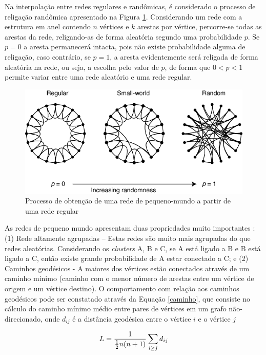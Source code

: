Na interpolação entre redes regulares e randômicas, é considerado o processo de religação randômica apresentado na Figura \ref{graph_world}. Considerando um rede com a estrutura em anel contendo $n$ vértices e $k$ arestas por vértice, percorre-se todas as arestas da rede, religando-as de forma aleatória segundo uma probabilidade $p$. Se $p = 0$ a aresta permanecerá intacta, pois não existe probabilidade alguma de religação, caso contrário, se $p = 1$, a aresta evidentemente será religada de forma aleatória na rede, ou seja, a escolha pelo valor de $p$, de forma que $0 < p < 1$ permite variar entre uma rede aleatório e uma rede regular.

\begin{figure}[!htb]
\centering
\includegraphics[scale=0.8]{./imagens/graph_world.png}
\caption{Processo de obtenção de uma rede de pequeno-mundo a partir de uma rede regular}
\label{graph_world}
\end{figure}
 
As redes de pequeno mundo apresentam duas propriedades muito importantes \cite{strogatz2001exploring}: (1) Rede altamente agrupadas – Estas redes são muito mais agrupadas do que redes aleatórias. Considerando os \textit{clusters} A, B e C, se A está ligado a B e B está ligado a C, então existe grande probabilidade de A estar conectado a C; e (2) Caminhos geodésicos - A maiores dos vértices estão conectados através de um caminho mínimo (caminho com o menor número de arestas entre um vértice de origem e um vértice destino). O comportamento com relação aos caminhos geodésicos pode ser constatado através da Equação \ref{caminho}, que consiste no cálculo do caminho mínimo médio entre pares de vértices em um grafo não-direcionado, onde $d_{ij}$ é a distância geodésica entre o vértice $i$ e o vértice $j$

\begin{equation}
  L = \frac{1}{\frac{1}{2} n(n+1)} \sum_{i \geq j}d_{ij}\\
  \label{caminho}
\end{equation}

